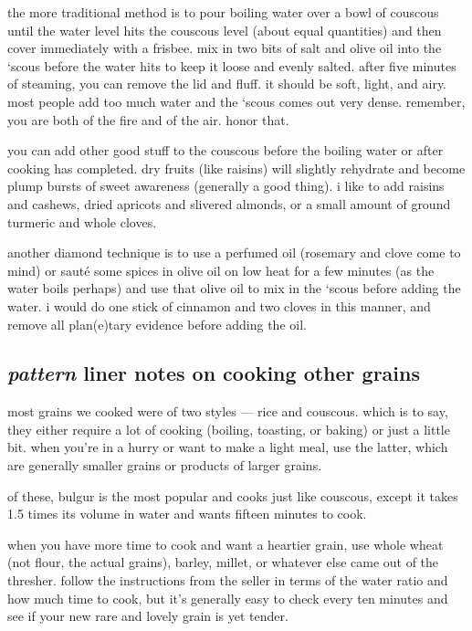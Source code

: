 the more traditional method is to pour boiling water over a bowl of couscous 
until the water level hits the couscous level (about equal quantities) and 
then cover immediately with a frisbee. mix in two bits of salt and olive oil 
into the `scous before the water hits to keep it loose and evenly salted. 
after five minutes of steaming, you can remove the lid and fluff. it should be 
soft, light, and airy. most people add too much water and the `scous comes out 
very dense. remember, you are both of the fire and of the air. honor that.

you can add other good stuff to the couscous before the boiling water or after 
cooking has completed. dry fruits (like raisins) will slightly rehydrate and 
become plump bursts of sweet awareness (generally a good thing). i like to add 
raisins and cashews, dried apricots and slivered almonds, or a small amount of 
ground turmeric and whole cloves. 

another diamond technique is to use a perfumed oil (rosemary and clove come to 
mind) or saut\'{e} some spices in olive oil on low heat for a few minutes (as 
the water boils perhaps) and use that olive oil to mix in the `scous before 
adding the water. i would do one stick of cinnamon and two cloves in this 
manner, and remove all plan(e)tary evidence before adding the oil.

\subsection{\textit{pattern} liner notes on cooking other grains}

most grains we cooked were of two styles --- rice and couscous. which is to 
say, they either require a lot of cooking (boiling, toasting, or baking) or 
just a little bit. when you're in a hurry or want to make a light meal, use 
the latter, which are generally smaller grains or products of larger grains.

of these, bulgur is the most popular and cooks just like couscous, except it 
takes 1.5 times its volume in water and wants fifteen minutes to cook.

when you have more time to cook and want a heartier grain, use whole wheat 
(not flour, the actual grains), barley, millet, or whatever else came out of 
the thresher. follow the instructions from the seller in terms of the water 
ratio and how much time to cook, but it's generally easy to check every ten 
minutes and see if your new rare and lovely grain is yet tender.

